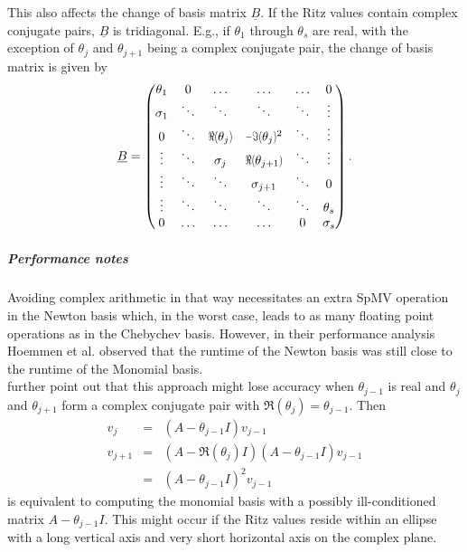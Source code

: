 \documentclass{scrartcl}
\begin{document}
This also affects the change of basis matrix $\underline{B}$. If the Ritz values contain complex conjugate pairs, $\underline{B}$ is tridiagonal. E.g., if $\theta_1$ through $\theta_s$ are real, with the exception of $\theta_j$ and $\theta_{j + 1}$ being a complex conjugate pair, the change of basis matrix is given by
\begin{equation*}
\iffalse
\begin{matrix}
\ddots & \ddots & \ddots & \ddots & \\
& \sigma_{j - 1} & $\scalebox{.7}[1]{$\Re$(}$ \theta_j$\scalebox{.7}[1]{$)$}$ & $\scalebox{.7}[1]{$-\Im($}$\theta_j$\scalebox{.7}[1]{$)$}$^2 & \\
& 0 & \sigma_j & $\scalebox{.7}[1]{$\Re$(}$ \theta_{j + 1}$\scalebox{.7}[1]{$)$}$ & \\
& & 0 & \sigma_{j + 1} & \\
& & \ddots & \ddots & \ddots \\
\end{matrix}
\fi
\underline{B} =
\begin{pmatrix}
\theta_1 & 0 & \ldots & \ldots & \ldots & 0 \\
\sigma_1 & \ddots & \ddots & \ddots & \ddots & \vdots \\
0 & \ddots & $\scalebox{.7}[1]{$\Re$(}$ \theta_j$\scalebox{.7}[1]{$)$}$ & $\scalebox{.7}[1]{$-\Im($}$\theta_j$\scalebox{.7}[1]{$)$}$^2 & \ddots & \vdots \\
\vdots & \ddots & \sigma_j & $\scalebox{.7}[1]{$\Re$(}$ \theta_{j + 1}$\scalebox{.7}[1]{$)$}$ & \ddots & \vdots \\
\vdots & \ddots & \ddots & \sigma_{j + 1} & \ddots & 0 \\
\vdots & \ddots & \ddots & \ddots & \ddots & \theta_s \\
0 & \ldots & \ldots & \ldots & 0 & \sigma_s \\
\end{pmatrix}.
\end{equation*}

\subparagraph{Performance notes}
Avoiding complex arithmetic in that way necessitates an extra SpMV operation in the Newton basis which, in the worst case, leads to as many floating point operations as in the Chebychev basis. However, in their performance analysis Hoemmen et al. \cite{Hoemmen:2010:CKS:1970638} observed that the runtime of the Newton basis was still close to the runtime of the Monomial basis. \\
\cite{Hoemmen:2010:CKS:1970638} further point out that this approach might lose accuracy when $\theta_{j - 1}$ is real and $\theta_j$ and $\theta_{j + 1}$ form a complex conjugate pair with $\Re(\theta_j) = \theta_{j - 1} $. Then
\begin{eqnarray*}
v_j &=& (A - \theta_{j - 1} I )v_{j - 1} \\
v_{j + 1} &=& (A - \Re(\theta_j) I )(A - \theta_{j - 1} I )v_{j - 1} \\
		  &=& (A - \theta_{j - 1} I )^2v_{j - 1}
\end{eqnarray*}
is equivalent to computing the monomial basis with a possibly ill-conditioned  matrix $A - \theta_{j - 1} I$. This might occur if the Ritz values reside within an ellipse with a long vertical axis and very short horizontal axis on the complex plane.
\end{document}
